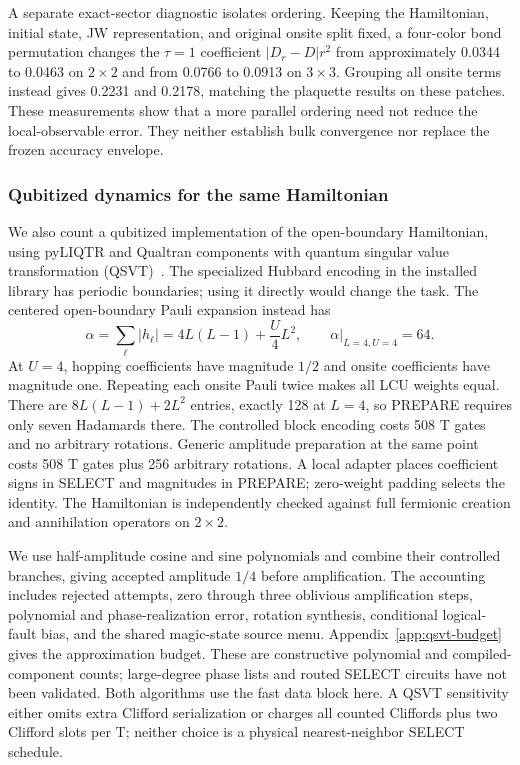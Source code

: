 \documentclass[11pt]{article}
\begin{document}
A separate exact-sector diagnostic isolates ordering. Keeping the
Hamiltonian, initial state, JW representation, and original onsite split
fixed, a four-color bond permutation changes the $\tau=1$ coefficient
$|D_r-D|r^2$ from approximately 0.0344 to 0.0463 on $2\times2$ and
from 0.0766 to 0.0913 on $3\times3$. Grouping all onsite terms instead
gives 0.2231 and 0.2178, matching the plaquette results on these patches.
These measurements show that a more parallel ordering need not reduce
the local-observable error. They neither establish bulk convergence nor
replace the frozen accuracy envelope.

\subsubsection{Qubitized dynamics for the same Hamiltonian}\label{sec:qsvt-comparison}
We also count a qubitized implementation of the open-boundary Hamiltonian,
using pyLIQTR and Qualtran components with quantum singular value
transformation (QSVT)~\cite{gilyen2019,babbush2018}. The specialized Hubbard
encoding in the installed library has periodic boundaries; using it directly
would change the task. The centered open-boundary Pauli expansion instead has
\begin{equation}
 \alpha=\sum_\ell |h_\ell|=4L(L-1)+\frac{U}{4}L^2,
 \qquad \alpha\big|_{L=4,U=4}=64.
\end{equation}
At $U=4$, hopping coefficients have magnitude $1/2$ and onsite coefficients
have magnitude one. Repeating each onsite Pauli twice makes all LCU weights
equal. There are $8L(L-1)+2L^2$ entries, exactly 128 at $L=4$, so PREPARE
requires only seven Hadamards there. The controlled block encoding costs
508 T gates and no arbitrary rotations. Generic amplitude preparation at
the same point costs 508 T gates plus 256 arbitrary rotations. A local
adapter places coefficient signs in SELECT and magnitudes in PREPARE;
zero-weight padding selects the identity. The Hamiltonian is independently
checked against full fermionic creation and annihilation operators on
$2\times2$.

We use half-amplitude cosine and sine polynomials and combine their
controlled branches, giving accepted amplitude $1/4$ before amplification.
The accounting includes rejected attempts, zero through three oblivious
amplification steps, polynomial and phase-realization error, rotation
synthesis, conditional logical-fault bias, and the shared magic-state source
menu. Appendix~\ref{app:qsvt-budget} gives the approximation budget.
These are constructive polynomial and compiled-component counts; large-degree
phase lists and routed SELECT circuits have not been validated. Both algorithms
use the fast data block here. A QSVT sensitivity either omits extra Clifford
serialization or charges all counted Cliffords plus two Clifford slots per T;
neither choice is a physical nearest-neighbor SELECT schedule.
\end{document}
